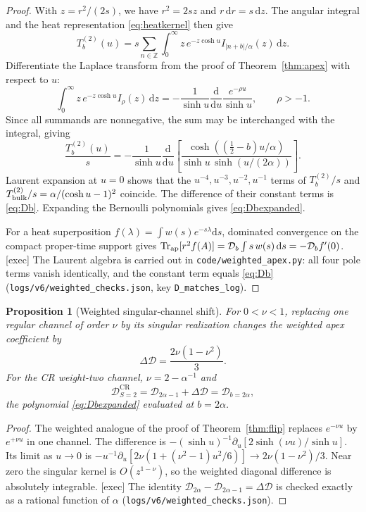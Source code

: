 \documentclass[11pt,a4paper]{article}
\newcommand{\ZZ}{\mathbb Z}
\newcommand{\dd}{\mathrm d}
\newcommand{\CR}{\mathrm{CR}}
\newcommand{\abs}[1]{\lvert #1\rvert}
\newcommand{\loc}[1]{\nolinkurl{#1}}
\newcommand{\ApTr}{\operatorname{Tr}_{\rm ap}}
\theoremstyle{plain}
\newtheorem{proposition}[theorem]{Proposition}
\theoremstyle{definition}
\theoremstyle{remark}
\numberwithin{equation}{section}
\begin{document}
\begin{proof}
With \(z=r^2/(2s)\), we have \(r^2=2sz\) and
\(r\,\dd r=s\,\dd z\).
The angular integral and the heat representation
\eqref{eq:heatkernel} then give
\[
T^{(2)}_b(u)=s\sum_{n\in\ZZ}\int_0^\infty
z\,e^{-z\cosh u}I_{\abs{n+b}/\alpha}(z)\,\dd z.
\]
Differentiate the Laplace transform from the proof of
Theorem~\ref{thm:apex} with respect to \(u\):
\[
\int_0^\infty z\,e^{-z\cosh u}I_\rho(z)\,\dd z
=-\frac1{\sinh u}\frac{\dd}{\dd u}
\frac{e^{-\rho u}}{\sinh u},
\qquad \rho>-1.
\]
Since all summands are nonnegative, the sum may be interchanged
with the integral, giving
\[
\frac{T^{(2)}_b(u)}{s}=-\frac1{\sinh u}\frac{\dd}{\dd u}
\left[\frac{\cosh((\tfrac12-b)u/\alpha)}
{\sinh u\,\sinh(u/(2\alpha))}\right].
\]
Laurent expansion at \(u=0\) shows that the
\(u^{-4},u^{-3},u^{-2},u^{-1}\) terms of
\(T^{(2)}_b/s\) and \(T^{(2)}_{\rm bulk}/s=\alpha/(\cosh u-1)^2\)
coincide.
The difference of their constant terms is \eqref{eq:Db}.
Expanding the Bernoulli polynomials gives \eqref{eq:Dbexpanded}.

For a heat superposition \(f(\lambda)=\int w(s)e^{-s\lambda}\dd s\),
dominated convergence on the compact proper-time support gives
\(\ApTr[r^2f(A)]=\mathcal D_b\int s\,w(s)\,\dd s
=-\mathcal D_bf'(0)\).
\textsf{[exec]} The Laurent algebra is carried out in
\loc{code/weighted_apex.py}: all four pole terms vanish identically,
and the constant term equals \eqref{eq:Db}
(\loc{logs/v6/weighted_checks.json}, key \texttt{D\_matches\_log}).
\end{proof}

\begin{proposition}[Weighted singular-channel shift]
\label{prop:weightedflip}
For \(0<\nu<1\), replacing one regular channel of order \(\nu\) by
its singular realization changes the weighted apex coefficient by
\[
\Delta\mathcal D=\frac{2\nu(1-\nu^2)}{3}.
\]
For the CR weight-two channel, \(\nu=2-\alpha^{-1}\) and
\[
\mathcal D^\CR_{S=2}=\mathcal D_{2\alpha-1}+\Delta\mathcal D
=\mathcal D_{b=2\alpha},
\]
the polynomial \eqref{eq:Dbexpanded} evaluated at \(b=2\alpha\).
\end{proposition}

\begin{proof}
The weighted analogue of the proof of Theorem~\ref{thm:flip}
replaces \(e^{-\nu u}\) by \(e^{+\nu u}\) in one channel.
The difference is
\(-(\sinh u)^{-1}\partial_u[2\sinh(\nu u)/\sinh u]\).
Its limit as \(u\to0\) is
\(-u^{-1}\partial_u[2\nu(1+(\nu^2-1)u^2/6)]
\to2\nu(1-\nu^2)/3\).
Near zero the singular kernel is \(O(z^{1-\nu})\), so the weighted
diagonal difference is absolutely integrable.
\textsf{[exec]} The identity
\(\mathcal D_{2\alpha}-\mathcal D_{2\alpha-1}=\Delta\mathcal D\) is
checked exactly as a rational function of \(\alpha\)
(\loc{logs/v6/weighted_checks.json}).
\end{proof}
\end{document}
